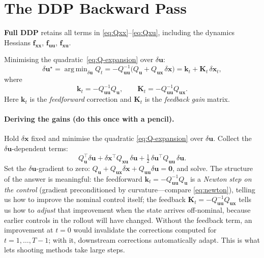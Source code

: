 \documentclass[11pt,twoside]{report}
\theoremstyle{definition}
\theoremstyle{plain}
\theoremstyle{remark}
\newcommand{\x}{\bm{x}}
\newcommand{\uu}{\bm{u}}
\newcommand{\f}{\bm{f}}
\newcommand{\0}{\bm{0}}
\DeclareMathOperator*{\argmin}{arg\,min}
\begin{document}
\section{The DDP Backward Pass}
\label{sec:ddp-backward}

\textbf{Full DDP} retains all terms in \eqref{eq:Qxx}--\eqref{eq:Qxu},
including the dynamics Hessians $\f_{\x\x}$, $\f_{\uu\uu}$, $\f_{\x\uu}$.

Minimising the quadratic~\eqref{eq:Q-expansion} over $\delta\uu$:
\begin{equation}\label{eq:opt-du}
\delta\uu^{\star}=\argmin_{\delta\uu}Q_{t}
=-Q_{\uu\uu}^{-1}\bigl(Q_{\uu}+Q_{\uu\x}\,\delta\x\bigr)
=\bm{k}_{t}+\bm{K}_{t}\,\delta\x_{t},
\end{equation}
where
\begin{equation}\label{eq:gains}
\boxed{
\bm{k}_{t}=-Q_{\uu\uu}^{-1}Q_{\uu},\qquad
\bm{K}_{t}=-Q_{\uu\uu}^{-1}Q_{\uu\x}.
}
\end{equation}
Here $\bm{k}_{t}$ is the \emph{feedforward} correction and
$\bm{K}_{t}$ is the \emph{feedback gain} matrix.

\paragraph{Deriving the gains (do this once with a pencil).}
Hold $\delta\x$ fixed and minimise the quadratic
\eqref{eq:Q-expansion} over $\delta\uu$. Collect the
$\delta\uu$-dependent terms:
\begin{equation*}
Q_{\uu}^{\!\top}\delta\uu
+\delta\x^{\!\top}Q_{\x\uu}\,\delta\uu
+\tfrac12\,\delta\uu^{\!\top}Q_{\uu\uu}\,\delta\uu.
\end{equation*}
Set the $\delta\uu$-gradient to zero:
$Q_{\uu}+Q_{\uu\x}\delta\x+Q_{\uu\uu}\delta\uu=\0$, and solve.
The structure of the answer is meaningful:
the feedforward $\bm{k}_{t}=-Q_{\uu\uu}^{-1}Q_{\uu}$ is a
\emph{Newton step on the control} (gradient preconditioned by
curvature---compare \eqref{eq:newton}), telling us how to improve the
nominal control itself; the feedback
$\bm{K}_{t}=-Q_{\uu\uu}^{-1}Q_{\uu\x}$ tells us how to \emph{adjust}
that improvement when the state arrives off-nominal, because earlier
controls in the rollout will have changed.
Without the feedback term, an improvement at $t=0$ would invalidate the
corrections computed for $t=1,\ldots,T-1$; with it, downstream
corrections automatically adapt. This is what lets shooting methods
take large steps.
\end{document}
